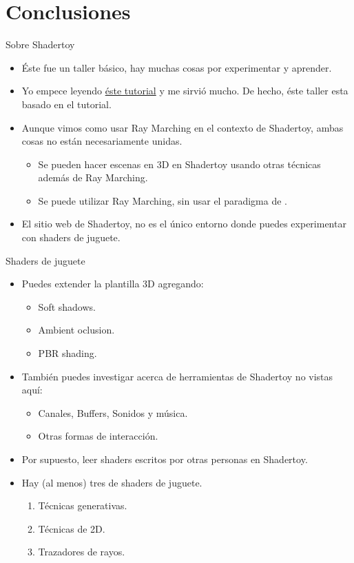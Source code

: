 \section{Conclusiones}

\begin{frame}{Sobre Shadertoy}
\begin{itemize}
    \item Éste fue un taller básico, hay muchas cosas por experimentar y aprender.
    \item Yo empece leyendo \href{https://inspirnathan.com/posts/47-shadertoy-tutorial-part-1}{éste tutorial} y me sirvió mucho. De hecho, éste taller esta basado en el tutorial.
    \item Aunque vimos como usar Ray Marching en el contexto de Shadertoy, ambas cosas no están necesariamente unidas.
    \begin{itemize}
        \item Se pueden hacer escenas en 3D en Shadertoy usando otras técnicas además de Ray Marching.
        \item Se puede utilizar Ray Marching, sin usar el paradigma de .
    \end{itemize}
    \item El sitio web de Shadertoy, no es el único entorno donde puedes experimentar con shaders de juguete.
\end{itemize}
\end{frame}

\begin{frame}{Shaders de juguete}
 \begin{itemize}
    \item Puedes extender la plantilla 3D agregando:
    \begin{itemize}
       \item Soft shadows.
       \item Ambient oclusion.
       \item PBR shading.
    \end{itemize}
    \item También puedes investigar acerca de herramientas de Shadertoy no vistas aquí:
    \begin{itemize}
        \item Canales, Buffers, Sonidos y música.
        \item Otras formas de interacción.
    \end{itemize}
    \item Por supuesto, leer shaders escritos por otras personas en Shadertoy.
    \item Hay (al menos) tres  de shaders de juguete.
    \begin{enumerate}
       \item Técnicas generativas.
       \item Técnicas de 2D.
       \item Trazadores de rayos.
    \end{enumerate}
  \end{itemize}
\end{frame}



